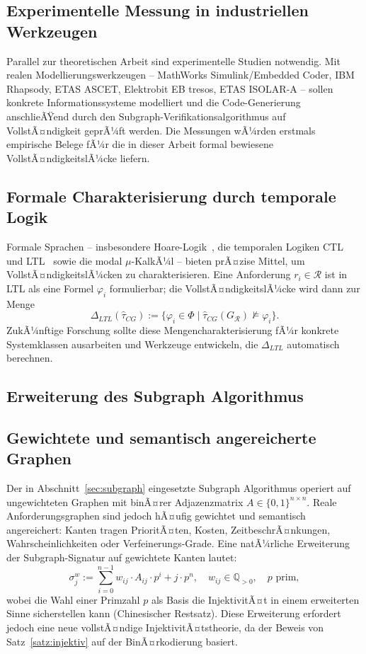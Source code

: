 ﻿\documentclass[a4paper,12pt]{report}
\theoremstyle{definition}
\begin{document}
\subsection{Experimentelle Messung in industriellen Werkzeugen}

Parallel zur theoretischen Arbeit sind experimentelle Studien notwendig.
Mit realen Modellierungswerkzeugen -- MathWorks Simulink/Embedded Coder, IBM Rhapsody,
ETAS ASCET, Elektrobit EB tresos, ETAS ISOLAR-A -- sollen konkrete Informationssysteme
modelliert und die Code-Generierung anschlieÃŸend durch den Subgraph-Verifikationsalgorithmus
auf VollstÃ¤ndigkeit geprÃ¼ft werden. Die Messungen wÃ¼rden erstmals empirische Belege fÃ¼r
die in dieser Arbeit formal bewiesene VollstÃ¤ndigkeitslÃ¼cke liefern.

\subsection{Formale Charakterisierung durch temporale Logik}

Formale Sprachen -- insbesondere Hoare-Logik~\cite{hoare1969}, die temporalen Logiken
CTL~\cite{clarke1982} und LTL~\cite{pnueli1977} sowie die modal $\mu$-KalkÃ¼l --
bieten prÃ¤zise Mittel, um VollstÃ¤ndigkeitslÃ¼cken zu charakterisieren. Eine Anforderung
$r_i \in \mathcal{R}$ ist in LTL als eine Formel $\varphi_i$ formulierbar; die
VollstÃ¤ndigkeitslÃ¼cke wird dann zur Menge
\[
  \Delta_{LTL}(\hat{\tau}_{CG}) :=
  \{\varphi_i \in \Phi \mid \hat{\tau}_{CG}(G_\mathcal{R}) \not\models \varphi_i\}.
\]
ZukÃ¼nftige Forschung sollte diese Mengencharakterisierung fÃ¼r konkrete Systemklassen
ausarbeiten und Werkzeuge entwickeln, die $\Delta_{LTL}$ automatisch berechnen.

\subsection{Erweiterung des Subgraph Algorithmus}

\subsection{Gewichtete und semantisch angereicherte Graphen}

Der in Abschnitt~\ref{sec:subgraph} eingesetzte Subgraph Algorithmus operiert auf
ungewichteten Graphen mit binÃ¤rer Adjazenzmatrix $A \in \{0,1\}^{n \times n}$.
Reale Anforderungsgraphen sind jedoch hÃ¤ufig gewichtet und semantisch angereichert:
Kanten tragen PrioritÃ¤ten, Kosten, ZeitbeschrÃ¤nkungen, Wahrscheinlichkeiten
oder Verfeinerungs-Grade. Eine natÃ¼rliche Erweiterung der Subgraph-Signatur auf
gewichtete Kanten lautet:
\[
  \sigma_j^w := \sum_{i=0}^{n-1} w_{ij} \cdot A_{ij} \cdot p^i + j \cdot p^n,
  \quad w_{ij} \in \mathbb{Q}_{>0}, \quad p \text{ prim},
\]
wobei die Wahl einer Primzahl $p$ als Basis die InjektivitÃ¤t in einem erweiterten
Sinne sicherstellen kann (Chinesischer Restsatz). Diese Erweiterung erfordert jedoch
eine neue vollstÃ¤ndige InjektivitÃ¤tstheorie, da der Beweis von Satz~\ref{satz:injektiv}
auf der BinÃ¤rkodierung basiert.
\end{document}
